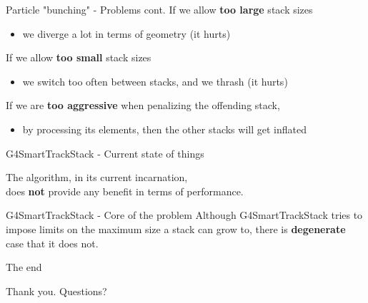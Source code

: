 \documentclass{beamer}
\begin{document}
\begin{frame}{Particle "bunching" - Problems cont.}
If we allow {\bf too large} stack sizes
\begin{itemize}
\item we diverge a lot in terms of geometry (it hurts)
\end{itemize}
If we allow {\bf too small} stack sizes
\begin{itemize}
\item we switch too often between stacks, and we thrash (it hurts)
\end{itemize}
\vspace{5mm}
If we are {\bf too aggressive} when penalizing the offending stack,
\begin{itemize}
\item by processing its elements, then the other stacks will get inflated
\end{itemize}

\begin{center}
\end{center}

\end{frame}

\begin{frame}{G4SmartTrackStack - Current state of things}

\begin{center}
The algorithm, in its current incarnation,\\
does {\bf not} provide any benefit in terms of performance.
\end{center}
\end{frame}

\begin{frame}{G4SmartTrackStack - Core of the problem}
Although G4SmartTrackStack tries to impose limits on the maximum size a
stack can grow to, there is {\bf degenerate} case that it does not.
\end{frame}

\begin{frame}{The end}
\vspace*{\fill}
\begin{center}
Thank you. Questions?
\end{center}
\vspace*{\fill}
\end{frame}
\end{document}
